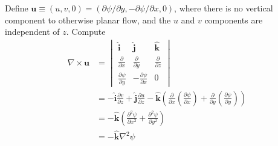 \documentclass[a4paper]{article}
\begin{document}
Define \( \pmb{u} \equiv \!\left( u,v,0 \right) = \!\left( \partial \psi / \partial y, -\partial \psi / \partial x, 0 \right) \), where there is no vertical component to otherwise planar flow, and the \( u \) and \( v \) components are independent of \( z \). Compute
\begin{align*}
	\nabla \times \pmb{u} & = \begin{vmatrix}
		\pmb{\hat{i}} & \pmb{\hat{j}} & \pmb{\hat{k}} \\
		\frac{\partial }{\partial x} & \frac{\partial }{\partial y} & \frac{\partial }{\partial z} \\
		\frac{\partial \psi}{\partial y} & -\frac{\partial \psi}{\partial x} & 0
	\end{vmatrix} \\
			      & = -\pmb{\hat{i}}\frac{\partial v}{\partial z} + \pmb{\hat{j}}\frac{\partial u}{\partial z} - \pmb{\hat{k}}\!\left( \frac{\partial }{\partial x}\!\left( \frac{\partial \psi}{\partial x} \right) + \frac{\partial }{\partial y}\!\left( \frac{\partial \psi}{\partial y} \right) \right) \\
			      & = -\pmb{\hat{k}}\!\left( \frac{\partial^2 \psi}{\partial x^2} + \frac{\partial^2 \psi}{\partial y^2} \right) \\
			      & = -\pmb{\hat{k}}\nabla^{2}\psi
\end{align*}

\end{document}
